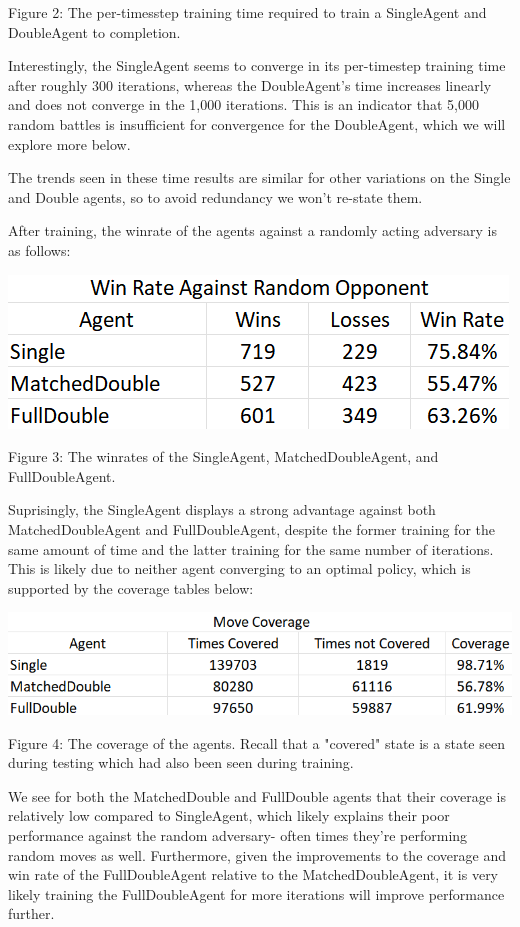 \documentclass{article}
\begin{document}
\quad	Figure 2: The per-timesstep training time required to train a SingleAgent and DoubleAgent to completion.

\quad Interestingly, the SingleAgent seems to converge in its per-timestep training time after roughly 300 iterations, whereas the DoubleAgent's time increases linearly and does not converge in the 1,000 iterations. This is an indicator that 5,000 random battles is insufficient for convergence for the DoubleAgent, which we will explore more below.

\quad	The trends seen in these time results are similar for other variations on the Single and Double agents, so to avoid redundancy we won't re-state them.

\quad After training, the winrate of the agents against a randomly acting adversary is as follows:

	\includegraphics[scale=1]{Win Rate}

\quad Figure 3: The winrates of the SingleAgent, MatchedDoubleAgent, and FullDoubleAgent.

\quad Suprisingly, the SingleAgent displays a strong advantage against both MatchedDoubleAgent and FullDoubleAgent, despite the former training for the same amount of time and the latter training for the same number of iterations. This is likely due to neither agent converging to an optimal policy, which is supported by the coverage tables below:

	\includegraphics[scale=.7]{Coverage}

\quad Figure 4: The coverage of the agents. Recall that a "covered" state is a state seen during testing which had also been seen during training.

\quad We see for both the MatchedDouble and FullDouble agents that their coverage is relatively low compared to SingleAgent, which likely explains their poor performance against the random adversary- often times they're performing random moves as well. Furthermore, given the improvements to the coverage and win rate of the FullDoubleAgent relative to the MatchedDoubleAgent, it is very likely training the FullDoubleAgent for more iterations will improve performance further.
\end{document}
